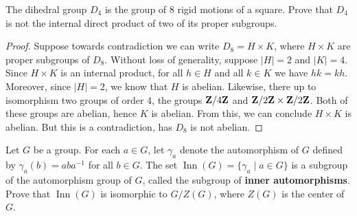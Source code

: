 \documentclass[10pt,twoside,openany]{memoir}
\begin{document}
\begin{problem}[S22, P2]
    The dihedral group $D_4$ is the group of 8 rigid motions of a square. Prove that $D_4$ is not the internal direct product of two of its proper subgroups.
\end{problem}
    {\color{blue} \begin{proof}
        Suppose towards contradiction we can write $D_8 = H \times K$, where $H \times K$ are proper subgroups of $D_8$. Without loss of generality, suppose $|H| = 2$ and $|K| = 4$. Since $H \times K$ is an internal product, for all $h \in H$ and all $k \in K$ we have $hk = kh$. Moreover, since $|H| = 2$, we know that $H$ is abelian. Likewise, there up to isomorphism two groups of order 4, the groups $\mathbf{Z}/4\mathbf{Z}$ and $\mathbf{Z}/2\mathbf{Z} \times \mathbf{Z}/2\mathbf{Z}$. Both of these groups are abelian, hence $K$ is abelian. From this, we can conclude $H \times K$ is abelian. But this is a contradiction, has $D_8$ is not abelian.
    \end{proof}}
\begin{problem}[W20, P3]
    Let $G$ be a group. For each $a \in G$, let $\gamma_a$ denote the automorphism of $G$ defined by $\gamma_a(b) = aba^{-1}$ for all $b \in G$. The set $\operatorname{Inn}(G) = \{\gamma_a \mid a \in G\}$ is a subgroup of the automorphism group of $G$, called the subgroup of \textbf{inner automorphisms}. Prove that $\operatorname{Inn}(G)$ is isomorphic to $G/Z(G)$, where $Z(G)$ is the center of $G$.
\end{problem}
\end{document}
